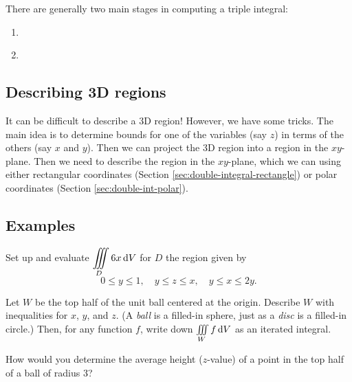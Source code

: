\noindent 
There are generally two main stages in computing a triple integral:
\begin{enumerate}
    \item \mbox{} \\ 
    \item \mbox{} \\ 
\end{enumerate}

\subsection{Describing 3D regions}
It can be difficult to describe a 3D region! However, we have some tricks. The main idea is to determine bounds for one of the variables (say $z$) in terms of the others (say $x$ and $y$). Then we can project the 3D region into a region in the $xy$-plane. Then we need to describe the region in the $xy$-plane, which we can using either rectangular coordinates (Section \ref{sec:double-integral-rectangle}) or polar coordinates (Section \ref{sec:double-int-polar}).

\pagebreak 

\subsection{Examples}
\begin{ex}
    Set up and evaluate $\displaystyle\iiint\limits_D 6x\mathop{}\!\mathrm{d} V$ for $D$ the region given by
    \[0\le y\le 1,\quad y\le z\le x,\quad y\le x\le 2y.\]
\end{ex}
\vfill 

\begin{ex}
    Let $W$ be the top half of the unit ball centered at the origin. Describe $W$ with inequalities for $x$, $y$, and $z$. (A \emph{ball} is a filled-in sphere, just as a \emph{disc} is a filled-in circle.) Then, for any function $f$, write down $\iiint\limits_W f\mathop{}\!\mathrm{d} V$ as an iterated integral.
\end{ex}

\vfill\vspace{1in}

\pagebreak 
\begin{ex}
    How would you determine the average height ($z$-value) of a point in the top half of a ball of radius 3?
\end{ex}

\vspace{1.5in}

